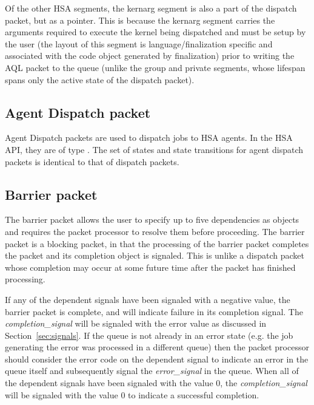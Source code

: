 \documentclass[final]{book}
\newcommand{\reffld}[1]{\textit{#1}}
\newcommand{\mariotodo}[1]{\todo[color=CarnationPink]{#1}}
\begin{document}
Of the other HSA segments, the kernarg segment is also a part of the dispatch
packet, but as a pointer. This is because the kernarg segment carries the
arguments required to execute the kernel being dispatched and must be setup by
the user (the layout of this segment is language/finalization specific and
associated with the code object generated by finalization) prior to writing the
AQL packet to the queue (unlike the group and private segments, whose lifespan
spans only the active state of the dispatch packet). %

\subsection{Agent Dispatch packet}\label{agent-packet}

Agent Dispatch packets are used to dispatch jobs to HSA agents. In the HSA API,
they are of type . The set of states and
state transitions for agent dispatch packets is identical to that of dispatch
packets.

\subsection{Barrier packet}\label{barrier-packet}

The barrier packet  allows the user to specify up to five dependencies as
 objects and requires the packet processor to
resolve them before proceeding. The barrier packet is a blocking packet, in that
the processing of the barrier packet completes the packet and its completion
object is signaled. This is unlike a dispatch packet whose completion may occur
at some future time after the packet has finished processing.

If any of the dependent signals have been signaled with a negative value, the
barrier packet is complete, and will indicate failure in its completion
signal. The \reffld{completion_signal} will be signaled with the error value as
discussed in Section~\ref{sec:signals}. If the queue is not already in an error
state (e.g. the job generating the error was processed in a different queue)
then the packet processor should consider the error code on the dependent signal
to indicate an error in the queue itself and subsequently signal the
\reffld{error_signal} in the queue. When all of the dependent signals have been
signaled with the value 0, the \reffld{completion_signal} will be signaled with
the value 0 to indicate a successful completion.
\end{document}

